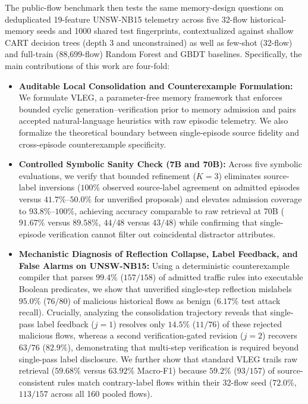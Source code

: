 \documentclass[10pt,a4paper,onecolumn]{article}
\theoremstyle{definition}
\theoremstyle{remark}
\begin{document}
The public-flow benchmark then tests the same memory-design questions on deduplicated 19-feature UNSW-NB15 telemetry across five 32-flow historical-memory seeds and 1000 shared test fingerprints, contextualized against shallow CART decision trees (depth 3 and unconstrained) as well as few-shot (32-flow) and full-train (88,699-flow) Random Forest and GBDT baselines. Specifically, the main contributions of this work are four-fold:
\begin{itemize}[leftmargin=1.8em]
    \item \textbf{Auditable Local Consolidation and Counterexample Formulation:} We formulate VLEG, a parameter-free memory framework that enforces bounded cyclic generation--verification prior to memory admission and pairs accepted natural-language heuristics with raw episodic telemetry. We also formalize the theoretical boundary between single-episode source fidelity and cross-episode counterexample specificity.
    \item \textbf{Controlled Symbolic Sanity Check (7B and 70B):} Across five symbolic evaluations, we verify that bounded refinement ($K=3$) eliminates source-label inversions ($100\%$ observed source-label agreement on admitted episodes versus $41.7\%$--$50.0\%$ for unverified proposals) and elevates admission coverage to $93.8\%$--$100\%$, achieving accuracy comparable to raw retrieval at 70B ($91.67\%$ versus $89.58\%$, $44/48$ versus $43/48$) while confirming that single-episode verification cannot filter out coincidental distractor attributes.
    \item \textbf{Mechanistic Diagnosis of Reflection Collapse, Label Feedback, and False Alarms on UNSW-NB15:} Using a deterministic counterexample compiler that parses $99.4\%$ ($157/158$) of admitted traffic rules into executable Boolean predicates, we show that unverified single-step reflection mislabels $95.0\%$ ($76/80$) of malicious historical flows as benign ($6.17\%$ test attack recall). Crucially, analyzing the consolidation trajectory reveals that single-pass label feedback ($j=1$) resolves only $14.5\%$ ($11/76$) of these rejected malicious flows, whereas a second verification-gated revision ($j=2$) recovers $63/76$ ($82.9\%$), demonstrating that multi-step verification is required beyond single-pass label disclosure. We further show that standard VLEG trails raw retrieval ($59.68\%$ versus $63.92\%$ Macro-F1) because $59.2\%$ ($93/157$) of source-consistent rules match contrary-label flows within their 32-flow seed ($72.0\%$, $113/157$ across all 160 pooled flows).

\end{itemize}
\end{document}
